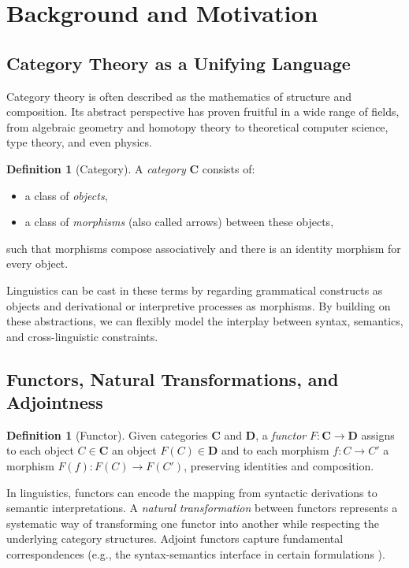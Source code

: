\documentclass[12pt]{article}
\theoremstyle{plain}
\theoremstyle{definition}
\newtheorem{definition}[theorem]{Definition}
\begin{document}
\section{Background and Motivation}

\subsection{Category Theory as a Unifying Language}
Category theory is often described as the mathematics of structure and composition. Its abstract perspective has proven fruitful in a wide range of fields, from algebraic geometry and homotopy theory to theoretical computer science, type theory, and even physics.

\begin{definition}[Category]
A \emph{category} \(\mathbf{C}\) consists of:
\begin{itemize}
    \item a class of \emph{objects},
    \item a class of \emph{morphisms} (also called arrows) between these objects,
\end{itemize}
such that morphisms compose associatively and there is an identity morphism for every object.
\end{definition}

Linguistics can be cast in these terms by regarding grammatical constructs as objects and derivational or interpretive processes as morphisms. By building on these abstractions, we can flexibly model the interplay between syntax, semantics, and cross-linguistic constraints.

\subsection{Functors, Natural Transformations, and Adjointness}
\begin{definition}[Functor]
Given categories \(\mathbf{C}\) and \(\mathbf{D}\), a \emph{functor} \(F: \mathbf{C} \to \mathbf{D}\) assigns to each object \(C \in \mathbf{C}\) an object \(F(C) \in \mathbf{D}\) and to each morphism \(f: C \to C'\) a morphism \(F(f): F(C) \to F(C')\), preserving identities and composition.
\end{definition}

In linguistics, functors can encode the mapping from syntactic derivations to semantic interpretations. A \emph{natural transformation} between functors represents a systematic way of transforming one functor into another while respecting the underlying category structures. Adjoint functors capture fundamental correspondences (e.g., the syntax-semantics interface in certain formulations \cite{BarkerShan}).
\end{document}
